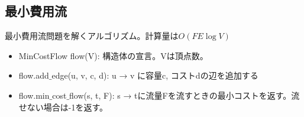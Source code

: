 \subsection{最小費用流}

最小費用流問題を解くアルゴリズム。計算量は$O(FE\log V)$

\begin{itemize}
    \item MinCostFlow flow(V): 構造体の宣言。Vは頂点数。
    \item flow.add$\_$edge(u, v, c, d): u → v に容量c, コストdの辺を追加する
    \item flow.min$\_$cost$\_$flow(s, t, F): s → tに流量Fを流すときの最小コストを返す。流せない場合は-1を返す。
\end{itemize}

